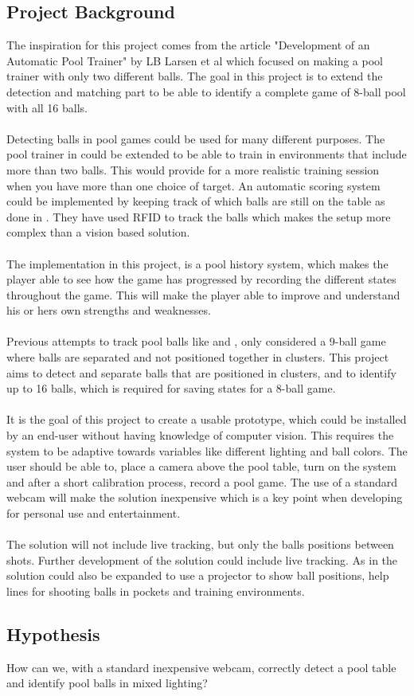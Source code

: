 \subsection{Project Background}
The inspiration for this project comes from the article "Development of an Automatic Pool Trainer"\cite{larsbopool} by LB Larsen et al which focused on making a pool trainer with only two different balls. The goal in this project is to extend the detection and matching part to be able to identify a complete game of 8-ball pool with all 16 balls.
\\\\
Detecting balls in pool games could be used for many different purposes. The pool trainer in \cite{larsbopool} could be extended to be able to train in environments that include more than two balls. This would provide for a more realistic training session when you have more than one choice of target. An automatic scoring system could be implemented by keeping track of which balls are still on the table as done in \cite{autoscore}. They have used RFID to track the balls which makes the setup more complex than a vision based solution.
\\\\
The implementation in this project, is a pool history system, which makes the player able to see how the game has progressed by recording the different states throughout the game. This will make the player able to improve and understand his or hers own strengths and weaknesses.
\\\\
Previous attempts to track pool balls like \cite{supportBilliard} and \cite{ARPool}, only considered a 9-ball game where balls are separated and not positioned together in clusters. This project aims to detect and separate balls that are positioned in clusters, and to identify up to 16 balls, which is required for saving states for a 8-ball game.
\\\\
It is the goal of this project to create a usable prototype, which could be installed by an end-user without having knowledge of computer vision. This requires the system to be adaptive towards variables like different lighting and ball colors. The user should be able to, place a camera above the pool table, turn on the system and after a short calibration process, record a pool game. The use of a standard webcam will make the solution inexpensive which is a key point when developing for personal use and entertainment.
\\\\
The solution will not include live tracking, but only the balls positions between shots. Further development of the solution could include live tracking. As in \cite{larsbopool} the solution could also be expanded to use a projector to show ball positions, help lines for shooting balls in pockets and training environments. 

\subsection{Hypothesis}
How can we, with a standard inexpensive webcam, correctly detect a pool table and identify pool balls in mixed lighting?
